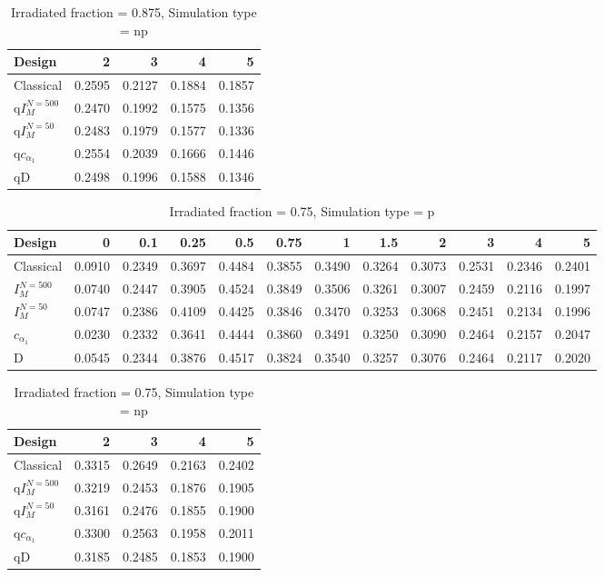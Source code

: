 \documentclass[a4paper]{article}
\begin{document}
\begin{table}[ht]
\centering
\begin{tabular}{lrrrr}
  \hline
Design & 2 & 3 & 4 & 5 \\ 
  \hline
Classical & 0.2595 & 0.2127 & 0.1884 & 0.1857 \\ 
  q$I_M^{N=500}$ & 0.2470 & 0.1992 & 0.1575 & 0.1356 \\ 
  q$I_M^{N=50}$ & 0.2483 & 0.1979 & 0.1577 & 0.1336 \\ 
  q$c_{\alpha_1}$ & 0.2554 & 0.2039 & 0.1666 & 0.1446 \\ 
  qD & 0.2498 & 0.1996 & 0.1588 & 0.1346 \\ 
   \hline
\end{tabular}
\caption{Irradiated fraction = 0.875, Simulation type = np} 
\end{table}

\begin{table}[ht]
\centering
\begin{tabular}{lrrrrrrrrrrr}
  \hline
Design & 0 & 0.1 & 0.25 & 0.5 & 0.75 & 1 & 1.5 & 2 & 3 & 4 & 5 \\ 
  \hline
Classical & 0.0910 & 0.2349 & 0.3697 & 0.4484 & 0.3855 & 0.3490 & 0.3264 & 0.3073 & 0.2531 & 0.2346 & 0.2401 \\ 
  $I_M^{N=500}$ & 0.0740 & 0.2447 & 0.3905 & 0.4524 & 0.3849 & 0.3506 & 0.3261 & 0.3007 & 0.2459 & 0.2116 & 0.1997 \\ 
  $I_M^{N=50}$ & 0.0747 & 0.2386 & 0.4109 & 0.4425 & 0.3846 & 0.3470 & 0.3253 & 0.3068 & 0.2451 & 0.2134 & 0.1996 \\ 
  $c_{\alpha_1}$ & 0.0230 & 0.2332 & 0.3641 & 0.4444 & 0.3860 & 0.3491 & 0.3250 & 0.3090 & 0.2464 & 0.2157 & 0.2047 \\ 
  D & 0.0545 & 0.2344 & 0.3876 & 0.4517 & 0.3824 & 0.3540 & 0.3257 & 0.3076 & 0.2464 & 0.2117 & 0.2020 \\ 
   \hline
\end{tabular}
\caption{Irradiated fraction = 0.75, Simulation type = p} 
\end{table}

\begin{table}[ht]
\centering
\begin{tabular}{lrrrr}
  \hline
Design & 2 & 3 & 4 & 5 \\ 
  \hline
Classical & 0.3315 & 0.2649 & 0.2163 & 0.2402 \\ 
  q$I_M^{N=500}$ & 0.3219 & 0.2453 & 0.1876 & 0.1905 \\ 
  q$I_M^{N=50}$ & 0.3161 & 0.2476 & 0.1855 & 0.1900 \\ 
  q$c_{\alpha_1}$ & 0.3300 & 0.2563 & 0.1958 & 0.2011 \\ 
  qD & 0.3185 & 0.2485 & 0.1853 & 0.1900 \\ 
   \hline
\end{tabular}
\caption{Irradiated fraction = 0.75, Simulation type = np} 
\end{table}
\end{document}
